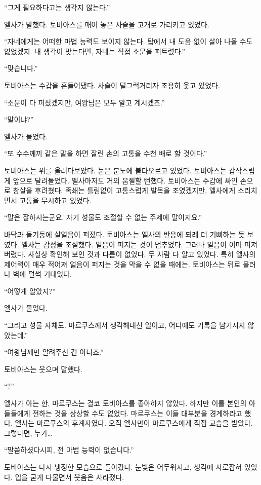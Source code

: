 ``그게 필요하다고는 생각지 않는다.''

엘사가 말했다. 토비아스를 매어 놓은 사슬을 고개로 가리키고 있었다.

``자네에게는 어떠한 마법 능력도 보이지 않는다. 탑에서 내 도움 없이 살아 나올 수도 없었겠지. 내 생각이 맞는다면, 자네는 직접 소문을 퍼트렸다.''

``맞습니다.''

토비아스는 수갑을 흔들어댔다. 사슬이 덜그럭거리자 조용히 웃고 있었다.

``소문이 다 퍼졌겠지만, 여왕님은 모두 알고 계시겠죠.''

`` 말이냐?''

엘사가 물었다.

``또 수수께끼 같은 말을 하면 잘린 손의 고통을 수천 배로 할 것이다.''

토비아스는 위를 올려다보았다. 눈은 분노에 불타오르고 있었다. 토비아스는 갑작스럽게 앞으로 달려들었다. 엘사마저도 거의 움찔할 뻔했다. 토비아스는 수갑에 싸인 손으로 창살을 후려쳤다. 족쇄는 틀림없이 고통스럽게 발목을 조였겠지만, 엘사에게 소리치면서 고통을 무시하고 있었다.

``말은 잘하시는군요. 자기 성물도 조절할 수 없는 주제에 말이지요.''

바닥과 돌기둥에 살얼음이 퍼졌다. 토비아스는 엘사의 반응에 되레 더 기뻐하는 듯 보였다. 엘사는 감정을 조절했다. 얼음이 퍼지는 것이 멈추었다. 그러나 얼음이 이미 퍼져버렸다. 사실상 확인해 보인 것과 다름이 없었다. 두 사람 다 알고 있었다. 특히 엘사의 제어력이 매우 적어져 얼음이 퍼지는 것을 막을 수 없을 때에는. 토비아스는 뒤로 물러나 벽에 털썩 기대었다.

``어떻게 알았지?''

엘사가 물었다.

``그리고 성물 자체도. 마르쿠스께서 생각해내신 일이고, 어디에도 기록을 남기시지 않았는데.''

``여왕님께만 알려주신 건 아니죠.''

토비아스는 웃으며 말했다.

``?''

엘사가 아는 한, 마르쿠스는 결코 토비아스를 좋아하지 않았다. 하지만 이를 본인의 아들들에게 전하는 것을 상상할 수도 없었다. 마르쿠스는 이들 대부분을 경계하라고 했다. 엘사는 마르쿠스의 후계자였다. 오직 엘사만이 마르쿠스에게 직접 교습을 받았다. 그렇다면, 누가\ldots

``말씀하셨다시피, 전 마법 능력이 없습니다.''

토비아스는 다시 냉정한 모습으로 돌아갔다. 눈빛은 어두워지고, 생각에 사로잡혀 있었다. 입을 굳게 다물면서 웃음은 사라졌다.

